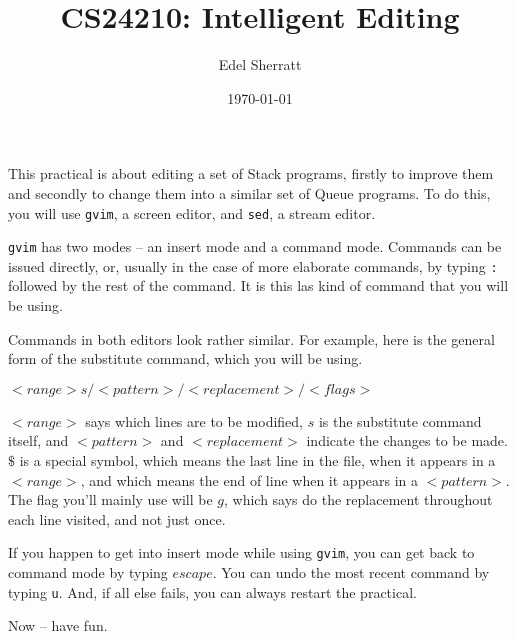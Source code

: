 
\pagestyle{empty}
\title{CS24210: Intelligent Editing}
\author{Edel Sherratt}
\date{\today}

\maketitle

This practical is about editing a set of Stack programs, firstly to
improve them and secondly to change them into a similar set of Queue
programs.  To do this, you will use {\tt gvim}, a screen
editor, and {\tt sed}, a stream editor.  

{\tt gvim} has two modes --
an insert mode and a command mode.  Commands can be issued directly,
or, usually in the case of more elaborate commands, by
typing {\tt :} followed by the rest of the command. It is this las
kind of command that you will be using. 

Commands in both editors look rather similar. For example, here
is the general form of the substitute command, which you will be using.

$<range>s/<pattern>/<replacement>/<flags>$


$<range>$ says which lines are to be modified, $s$ is the substitute 
command itself,
and $<pattern>$ and $<replacement>$ indicate the changes to be made.
$\$$ is a special symbol, which means the last line in the file, when
it appears in a $<range>$, and which means the end of line when it
appears in a $<pattern>$.  The flag you'll mainly use will be $g$, which
says do the replacement throughout each line visited, and not just once.

If you happen to get into insert mode while using {\tt gvim}, you can get 
back to command mode by typing $escape$. You can undo the most recent
command by typing {\tt u}.  And, if all else fails, you can always restart
the practical.

Now -- have fun.

